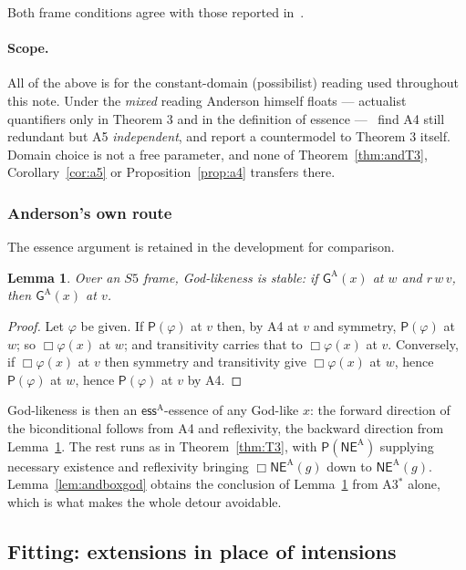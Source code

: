 \documentclass[11pt]{article}
\theoremstyle{plain}
\newtheorem{lemma}[theorem]{Lemma}
\theoremstyle{definition}
\newcommand{\ess}{\mathrel{\mathsf{ess}}}
\newcommand{\NE}{\mathsf{NE}}
\newcommand{\Gd}{\mathsf{G}}
\newcommand{\Pos}{\mathsf{P}}
\begin{document}
\noindent
Both frame conditions agree with those reported in~\cite{bww2017}.

\paragraph{Scope.} All of the above is for the constant-domain (possibilist)
reading used throughout this note. Under the \emph{mixed} reading Anderson
himself floats --- actualist quantifiers only in Theorem 3 and in the
definition of essence ---~\cite{bww2017} find A4 still redundant but A5
\emph{independent}, and report a countermodel to Theorem 3 itself. Domain
choice is not a free parameter, and none of Theorem~\ref{thm:andT3},
Corollary~\ref{cor:a5} or Proposition~\ref{prop:a4} transfers there.

\subsubsection*{Anderson's own route}

The essence argument is retained in the development for comparison.

\begin{lemma}\label{lem:transfer}
Over an $S5$ frame, God-likeness is stable: if $\Gd^{\mathrm{A}}(x)$ at $w$ and
$r\,w\,v$, then $\Gd^{\mathrm{A}}(x)$ at $v$.
\end{lemma}

\begin{proof}
Let $\varphi$ be given. If $\Pos(\varphi)$ at $v$ then, by A4 at $v$ and
symmetry, $\Pos(\varphi)$ at $w$; so $\Box\varphi(x)$ at $w$; and transitivity
carries that to $\Box\varphi(x)$ at $v$. Conversely, if $\Box\varphi(x)$ at $v$
then symmetry and transitivity give $\Box\varphi(x)$ at $w$, hence
$\Pos(\varphi)$ at $w$, hence $\Pos(\varphi)$ at $v$ by A4.
\end{proof}

\noindent
God-likeness is then an $\ess^{\mathrm{A}}$-essence of any God-like $x$: the
forward direction of the biconditional follows from A4 and reflexivity, the
backward direction from Lemma~\ref{lem:transfer}. The rest runs as in
Theorem~\ref{thm:T3}, with $\Pos(\NE^{\mathrm{A}})$ supplying necessary
existence and reflexivity bringing $\Box\NE^{\mathrm{A}}(g)$ down to
$\NE^{\mathrm{A}}(g)$. Lemma~\ref{lem:andboxgod} obtains the conclusion of
Lemma~\ref{lem:transfer} from A3$^{*}$ alone, which is what makes the whole
detour avoidable.

\subsection{Fitting: extensions in place of intensions}
\end{document}
